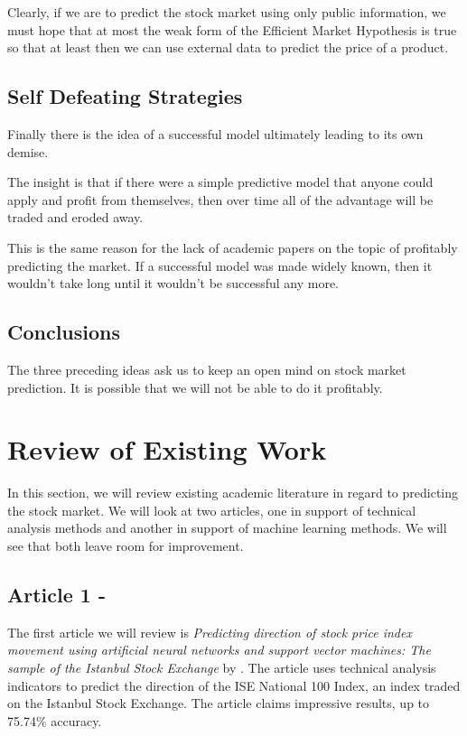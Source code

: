 \documentclass{report}
\begin{document}
Clearly, if we are to predict the stock market using only public information, we must hope that at most the weak form of the Efficient Market Hypothesis is true so that at least then we can use external data to predict the price of a product.

\section{Self Defeating Strategies}

Finally there is the idea of a successful model ultimately leading to its own demise. 

The insight is that if there were a simple predictive model that anyone could apply and profit from themselves, then over time all of the advantage will be traded and eroded away.

This is the same reason for the lack of academic papers on the topic of profitably predicting the market. If a successful model was made widely known, then it wouldn't take long until it wouldn't be successful any more.

\section{Conclusions}

The three preceding ideas ask us to keep an open mind on stock market prediction. It is possible that we will not be able to do it profitably.

\chapter{Review of Existing Work}

In this section, we will review existing academic literature in regard to predicting the stock market. We will look at two articles, one in support of technical analysis methods and another in support of machine learning methods. We will see that both leave room for improvement.

\section{Article 1 - \citet{kara2011predicting}} 

The first article we will review is \textit{Predicting direction of stock price index movement using artificial neural networks and support vector machines: The sample of the Istanbul Stock Exchange} by \citet{kara2011predicting}. The article uses technical analysis indicators to predict the direction of the ISE National 100 Index, an index traded on the Istanbul Stock Exchange. The article claims impressive results, up to 75.74\% accuracy.
\end{document}

